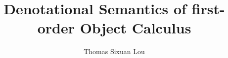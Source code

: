 \documentclass{article}
\begin{document}
\title{Denotational Semantics of first-order Object Calculus}
\author{Thomas Sixuan Lou}
\maketitle

\tableofcontents








\end{document}
